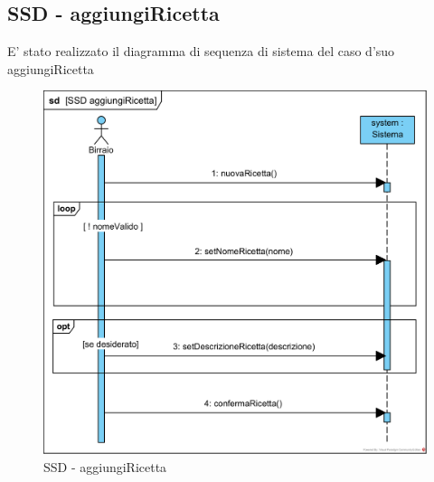 \documentclass[a4paper,12pt]{report}
\begin{document}
		\subsection{SSD - aggiungiRicetta}
			E' stato realizzato il diagramma di sequenza di sistema del caso d'suo aggiungiRicetta
			\begin{figure}[!h]
				\centering
				\includegraphics[width=0.8\linewidth]{image/SSD-aggiungiRicetta.png}
				\caption{SSD - aggiungiRicetta}\label{fig:1}
			\end{figure}	
		\newpage	
\end{document}

